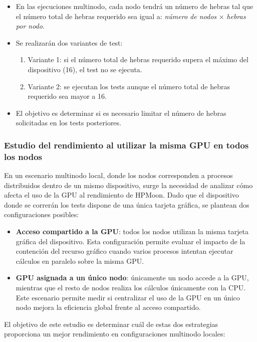 \begin{itemize}
    \item En las ejecuciones multinodo, cada nodo tendrá un número de hebras tal que el número total de hebras requerido sea igual a: \textit{número de nodos} $\times$ \textit{hebras por nodo}.
    \item Se realizarán dos variantes de test:
          \begin{enumerate}
              \item Variante 1: si el número total de hebras requerido supera el máximo del dispositivo (16), el test no se ejecuta.
              \item Variante 2: se ejecutan los tests aunque el número total de hebras requerido sea mayor a 16.
          \end{enumerate}
    \item El objetivo es determinar si es necesario limitar el número de hebras solicitadas en los tests posteriores.
\end{itemize}

\subsubsection{Estudio del rendimiento al utilizar la misma GPU en todos los nodos}

En un escenario multinodo local, donde los nodos corresponden a procesos distribuidos dentro de un mismo dispositivo, surge la necesidad de analizar cómo afecta el uso de la GPU al rendimiento de HPMoon. Dado que el dispositivo donde se correrán los tests dispone de una única tarjeta gráfica, se plantean dos configuraciones posibles:

\begin{itemize}
    \item \textbf{Acceso compartido a la GPU}: todos los nodos utilizan la misma tarjeta gráfica del dispositivo. Esta configuración permite evaluar el impacto de la contención del recurso gráfico cuando varios procesos intentan ejecutar cálculos en paralelo sobre la misma GPU.
    \item \textbf{GPU asignada a un único nodo}: únicamente un nodo accede a la GPU, mientras que el resto de nodos realiza los cálculos únicamente con la CPU. Este escenario permite medir si centralizar el uso de la GPU en un único nodo mejora la eficiencia global frente al acceso compartido.
\end{itemize}

El objetivo de este estudio es determinar cuál de estas dos estrategias proporciona un mejor rendimiento en configuraciones multinodo locales:

